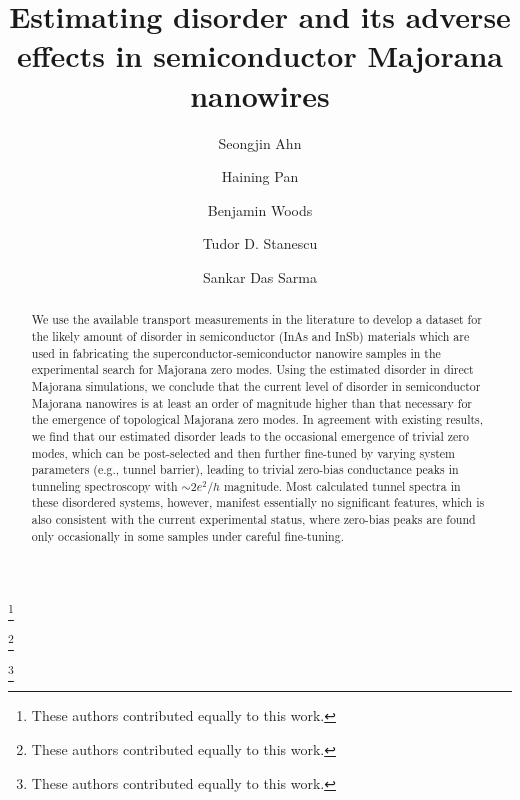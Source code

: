 \documentclass[aps,prmaterials,twocolumn,superscriptaddress,longbibliography]{revtex4-2}
\begin{document}
\title{Estimating disorder and its adverse effects in semiconductor Majorana nanowires}

\author{Seongjin Ahn}
\thanks{These authors contributed equally to this work.}

\author{Haining Pan}
\thanks{These authors contributed equally to this work.}

\author{Benjamin Woods}
\thanks{These authors contributed equally to this work.}

\author{Tudor D. Stanescu}

\author{Sankar Das Sarma}

\begin{abstract}
We use the available transport measurements in the literature to develop a dataset for the likely amount of disorder in semiconductor (InAs and InSb) materials which are used in fabricating the superconductor-semiconductor nanowire samples in the experimental search for Majorana zero modes.  Using the estimated disorder in direct Majorana simulations, we conclude that the current level of disorder in semiconductor Majorana nanowires is at least an order of magnitude higher than that necessary for the emergence of topological Majorana zero modes.  In agreement with existing results, we find that our estimated disorder leads to the occasional emergence of trivial zero modes, which can be post-selected and then further fine-tuned by varying system parameters (e.g., tunnel barrier), leading to trivial zero-bias conductance peaks in tunneling spectroscopy with $ \sim 2e^2/h $  magnitude.  Most calculated tunnel spectra in these disordered systems, however, manifest essentially no significant features, which is also consistent with the current experimental status, where zero-bias peaks are found only occasionally in some samples under careful fine-tuning.
\end{abstract}
\end{document}
